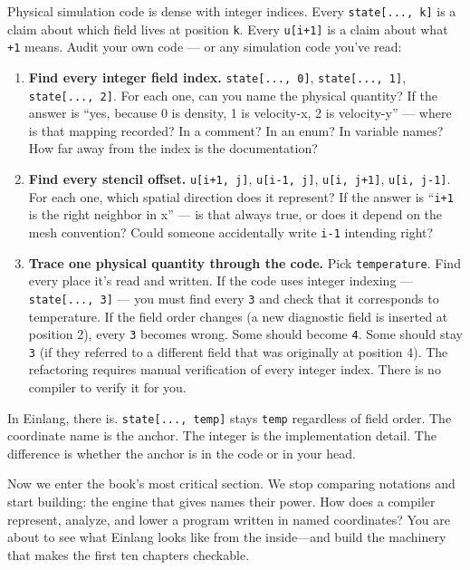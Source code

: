 \documentclass[11pt,titlepage]{article}
\begin{document}
Physical simulation code is dense with integer indices. Every
\texttt{state{[}...,\ k{]}} is a claim about which field lives at
position \texttt{k}. Every \texttt{u{[}i+1{]}} is a claim about what
\texttt{+1} means. Audit your own code --- or any simulation code you've
read:

\begin{enumerate}
\def\labelenumi{\arabic{enumi}.}
\item
  \textbf{Find every integer field index.} \texttt{state{[}...,\ 0{]}},
  \texttt{state{[}...,\ 1{]}}, \texttt{state{[}...,\ 2{]}}. For each
  one, can you name the physical quantity? If the answer is ``yes,
  because 0 is density, 1 is velocity-x, 2 is velocity-y'' --- where is
  that mapping recorded? In a comment? In an enum? In variable names?
  How far away from the index is the documentation?
\item
  \textbf{Find every stencil offset.} \texttt{u{[}i+1,\ j{]}},
  \texttt{u{[}i-1,\ j{]}}, \texttt{u{[}i,\ j+1{]}},
  \texttt{u{[}i,\ j-1{]}}. For each one, which spatial direction does it
  represent? If the answer is ``\texttt{i+1} is the right neighbor in
  x'' --- is that always true, or does it depend on the mesh convention?
  Could someone accidentally write \texttt{i-1} intending right?
\item
  \textbf{Trace one physical quantity through the code.} Pick
  \texttt{temperature}. Find every place it's read and written. If the
  code uses integer indexing --- \texttt{state{[}...,\ 3{]}} --- you
  must find every \texttt{3} and check that it corresponds to
  temperature. If the field order changes (a new diagnostic field is
  inserted at position 2), every \texttt{3} becomes wrong. Some should
  become \texttt{4}. Some should stay \texttt{3} (if they referred to a
  different field that was originally at position 4). The refactoring
  requires manual verification of every integer index. There is no
  compiler to verify it for you.
\end{enumerate}

In Einlang, there is. \texttt{state{[}...,\ temp{]}} stays \texttt{temp}
regardless of field order. The coordinate name is the anchor. The
integer is the implementation detail. The difference is whether the
anchor is in the code or in your head.

Now we enter the book's most critical section. We stop comparing
notations and start building: the engine that gives names their power.
How does a compiler represent, analyze, and lower a program written in
named coordinates? You are about to see what Einlang looks like from the
inside---and build the machinery that makes the first ten chapters
checkable.
\end{document}
